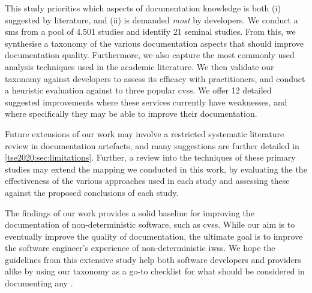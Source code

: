 This study priorities which aspects of  documentation knowledge is both (i) suggested by literature, and (ii) is demanded \textit{most} by developers.
We conduct a \gls{sms} from a pool of 4,501 studies and identify 21 seminal studies. From this, we synthesise a taxonomy of the various documentation aspects that should improve  documentation quality. Furthermore, we also capture the most commonly used analysis techniques used in the academic literature. We then validate our taxonomy against developers to assess its efficacy with practitioners, and conduct a heuristic evaluation against to three popular \glspl{cvs}. We offer 12 detailed suggested improvements where these services currently have weaknesses, and where specifically they may be able to improve their documentation.

Future extensions of our work may involve a restricted systematic literature review in  documentation artefacts, and many suggestions are further detailed in \cref{tse2020:sec:limitations}. Further, a review into the techniques of these primary studies may extend the mapping we conducted in this work, by evaluating the the effectiveness of the various approaches used in each study and assessing these against the proposed conclusions of each study.

The findings of our work provides a solid baseline for improving the documentation of non-deterministic software, such as \glspl{cvs}. While our aim is to eventually improve the quality of  documentation, the ultimate goal is to improve the software engineer's experience of non-deterministic \glspl{iws}. We hope the guidelines from this extensive study help both software developers and  providers alike by using our taxonomy as a go-to checklist for what should be considered in documenting any .